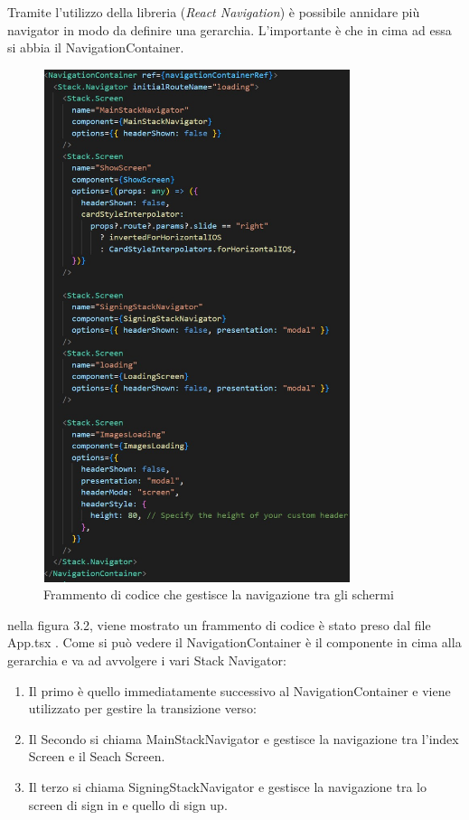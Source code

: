 Tramite l'utilizzo della libreria {}(\textit{React Navigation}) \`e possibile annidare pi\`u navigator in modo da definire una gerarchia. L'importante \`e che in cima ad essa si abbia il NavigationContainer.\\
\begin{figure}[h]
    \centering
    \includegraphics[width=9cm, height=15cm]{images/navigationCode.jpg}
    \caption[differenzeiteot]{Frammento di codice che gestisce la navigazione tra gli schermi}
    \label{fig:Navigation code}
\end{figure}

nella figura 3.2, viene mostrato un frammento di codice \`e stato preso dal file App.tsx . Come si pu\`o vedere il NavigationContainer \`e il componente in cima alla gerarchia e va ad avvolgere i vari Stack Navigator:
\begin{enumerate}
    \item Il primo \`e quello immediatamente successivo al NavigationContainer e viene utilizzato per gestire la transizione verso:
    \item Il Secondo si chiama MainStackNavigator e gestisce la navigazione tra l'index Screen e il Seach Screen.
    \item Il terzo si chiama SigningStackNavigator e gestisce la navigazione tra lo screen di sign in e quello di sign up.
\end{enumerate}

